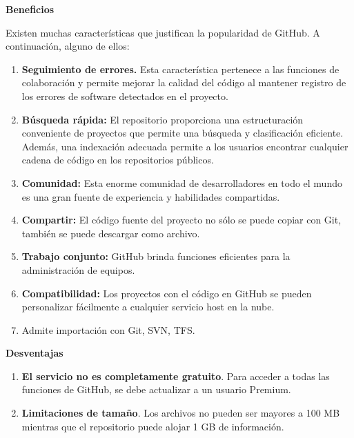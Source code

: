 \documentclass{article} %
\begin{document}
\noindent \textbf{Beneficios}

\noindent Existen muchas caracter\'{i}sticas que justifican la popularidad de GitHub. A continuaci\'{o}n, alguno de ellos:

\begin{enumerate}
\item  \textbf{Seguimiento de errores.} Esta caracter\'{i}stica pertenece a las funciones de colaboraci\'{o}n y permite mejorar la calidad del c\'{o}digo al mantener registro de los errores de software detectados en el proyecto.

\item  \textbf{B\'{u}squeda r\'{a}pida:} El repositorio proporciona una estructuraci\'{o}n conveniente de proyectos que permite una b\'{u}squeda y clasificaci\'{o}n eficiente. Adem\'{a}s, una indexaci\'{o}n adecuada permite a los usuarios encontrar cualquier cadena de c\'{o}digo en los repositorios p\'{u}blicos.

\item  \textbf{Comunidad:} Esta enorme comunidad de desarrolladores en todo el mundo es una gran fuente de experiencia y habilidades compartidas.

\item  \textbf{Compartir:} El c\'{o}digo fuente del proyecto no s\'{o}lo se puede copiar con Git, tambi\'{e}n se puede descargar como archivo.

\item  \textbf{Trabajo conjunto:} GitHub brinda funciones eficientes para la administraci\'{o}n de equipos.

\item  \textbf{Compatibilidad:} Los proyectos con el c\'{o}digo en GitHub se pueden personalizar f\'{a}cilmente a cualquier servicio host en la nube.

\item  Admite importaci\'{o}n con Git, SVN, TFS.
\end{enumerate}

\noindent \textbf{Desventajas}

\begin{enumerate}
\item \textbf{ El servicio no es completamente gratuito}. Para acceder a todas las funciones de GitHub, se debe actualizar a un usuario Premium.

\item  \textbf{Limitaciones de tama\~{n}o}. Los archivos no pueden ser mayores a 100 MB mientras que el repositorio puede alojar 1 GB de informaci\'{o}n.
\end{enumerate}
\end{document}
